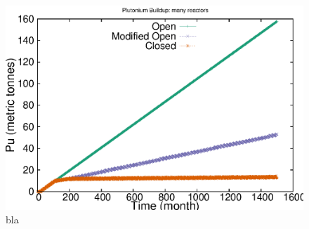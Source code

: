 \begin{figure}[!]
\label{fig:puseries-n}
\caption{bla}
\begin{center}
\includegraphics{./images/puseries-n.eps}
\end{center}
\end{figure}

